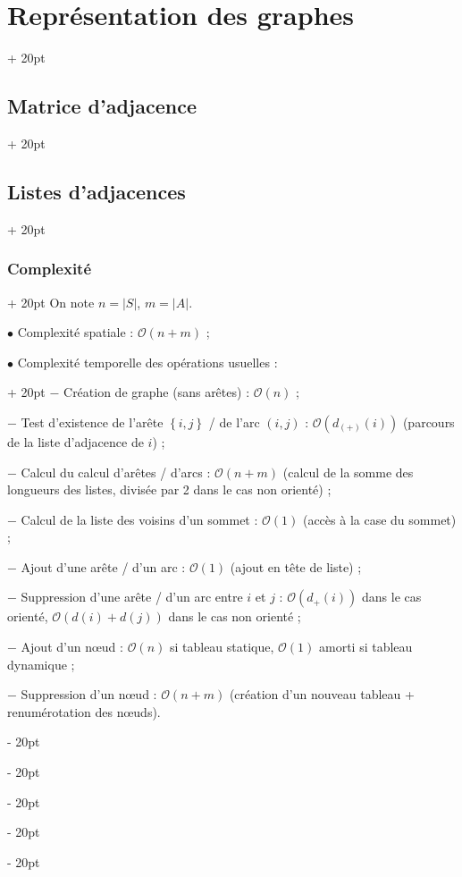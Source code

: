 \documentclass[a4paper, 12pt, twoside]{article}
\newcommand{\lr}[1]{\left( #1 \right)}
\newcommand{\set}[1]{\left\{ #1 \right\}}
\newcommand{\abs}[1]{\left\lvert #1 \right\rvert}
\newcommand{\ind}[1][20pt]{\advance\leftskip + #1}
\newcommand{\deind}[1][20pt]{\advance\leftskip - #1}
\newenvironment{indt}[2][20pt]{#2 \par \ind[#1]}{\par \deind} %
\begin{document}
\begin{indt}{\section{Représentation des graphes}}
\begin{indt}{\subsection{Matrice d'adjacence}}
\begin{indt}{\subsection{Listes d'adjacences}}
\begin{indt}{\subsubsection{Complexité}}
                    On note $n = \abs S$, $m = \abs A$.

                    $\bullet$ Complexité spatiale : $\mathcal O(n + m)$ ;

                    \begin{indt}{$\bullet$ Complexité temporelle des opérations usuelles :}
                        $-$ Création de graphe (sans arêtes) : $\mathcal O(n)$ ;

                        $-$ Test d'existence de l'arête $\set{i, j}$ / de l'arc $(i, j)$ : $\mathcal O\!\lr{d_{(+)}(i)}$ (parcours de la liste d'adjacence de $i$) ;

                        $-$ Calcul du calcul d'arêtes / d'arcs : $\mathcal O(n + m)$ (calcul de la somme des longueurs des listes, divisée par 2 dans le cas non orienté) ;

                        $-$ Calcul de la liste des voisins d'un sommet : $\mathcal O(1)$ (accès à la case du sommet) ;

                        $-$ Ajout d'une arête / d'un arc : $\mathcal O(1)$ (ajout en tête de liste) ;

                        $-$ Suppression d'une arête / d'un arc entre $i$ et $j$ : $\mathcal O\!\lr{d_+(i)}$ dans le cas orienté, $\mathcal O\!\lr{d(i) + d(j)}$ dans le cas non orienté ;

                        $-$ Ajout d'un n\oe ud : $\mathcal O(n)$ si tableau statique, $\mathcal O(1)$ amorti si tableau dynamique ;

                        $-$ Suppression d'un n\oe ud : $\mathcal O(n + m)$ (création d'un nouveau tableau + renumérotation des n\oe uds).
                    \end{indt}
                \end{indt}
            \end{indt}
        \end{indt}
    \end{indt}

    \vspace{12pt}
    
\end{document}
